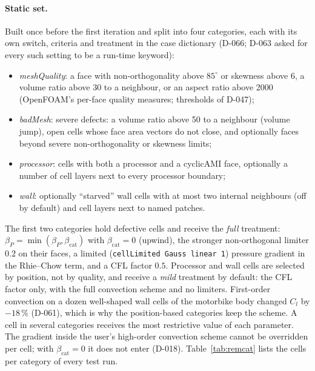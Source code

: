 \documentclass[11pt,a4paper]{article}
\newcommand{\code}[1]{\texttt{#1}}
\begin{document}
\paragraph{Static set.} Built once before the first iteration and split
into four categories, each with its own switch, criteria and treatment in
the case dictionary (D-066; D-063 asked for every such setting to be a
run-time keyword):
\begin{itemize}
\item \emph{meshQuality}: a face with non-orthogonality above $85^\circ$ or
  skewness above 6, a volume ratio above 30 to a neighbour, or an aspect
  ratio above 2000 (OpenFOAM's per-face quality measures; thresholds of
  D-047);
\item \emph{badMesh}: severe defects: a volume ratio above 50 to a neighbour
  (volume jump), open cells whose face area vectors do not close, and
  optionally faces beyond severe non-orthogonality or skewness limits;
\item \emph{processor}: cells with both a processor and a cyclicAMI face,
  optionally a number of cell layers next to every processor boundary;
\item \emph{wall}: optionally ``starved'' wall cells with at most two
  internal neighbours (off by default) and cell layers next to named
  patches.
\end{itemize}
The first two categories hold defective cells and receive the \emph{full}
treatment: $\beta_P=\min(\beta_P,\beta_{\mathrm{cat}})$ with
$\beta_{\mathrm{cat}}=0$ (upwind), the stronger non-orthogonal limiter $0.2$
on their faces, a limited (\code{cellLimited Gauss linear 1}) pressure
gradient in the Rhie--Chow term, and a CFL factor $0.5$. Processor and wall
cells are selected by position, not by quality, and receive a \emph{mild}
treatment by default: the CFL factor only, with the full convection scheme
and no limiters. First-order convection on a dozen well-shaped wall cells of
the motorbike body changed $C_l$ by $-18\,\%$ (D-061), which is why the
position-based categories keep the scheme. A cell in several categories
receives the most restrictive value of each parameter. The gradient inside
the user's high-order convection scheme cannot be overridden per cell; with
$\beta_{\mathrm{cat}}=0$ it does not enter (D-018). Table~\ref{tab:remcat}
lists the cells per category of every test run.
\end{document}
